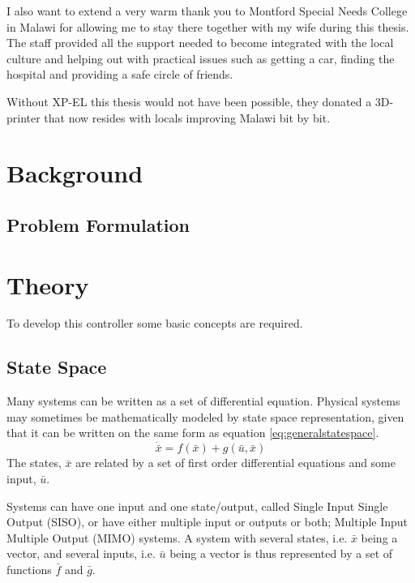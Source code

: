 \documentclass{article}
\begin{document}
I also want to extend a very warm thank you to Montford Special Needs College in Malawi for allowing me to stay there together with my wife during this thesis.
The staff provided all the support needed to become integrated with the local culture and helping out with practical issues such as getting a car, finding the hospital and providing a safe circle of friends.

Without XP-EL this thesis would not have been possible, they donated a 3D-printer that now resides with locals improving Malawi bit by bit.

\newpage

\tableofcontents

\newpage

\newpage

\section{Background}


\subsection{Problem Formulation}


\section{Theory}
To develop this controller some basic concepts are required.
\subsection{State Space}
Many systems can be written as a set of differential equation.
Physical systems may sometimes be mathematically modeled by state space representation, given that it can be written on the same form as equation \ref{eq:generalstatespace}.
\begin{equation}
    \dot{\bar{x}} = f(\bar{x}) + g(\bar{u},\bar{x})
    \label{eq:generalstatespace}
\end{equation}
The states, $\bar{x}$ are related by a set of first order differential equations and some input, $\bar{u}$.

Systems can have one input and one state/output, called Single Input Single Output (SISO), or have either multiple input or outputs or both; Multiple Input Multiple Output (MIMO) systems.
A system with several states, i.e. $\bar{x}$ being a vector, and several inputs, i.e. $\bar{u}$ being a vector is thus represented by a set of functions $\bar{f}$ and $\bar{g}$.
\end{document}
